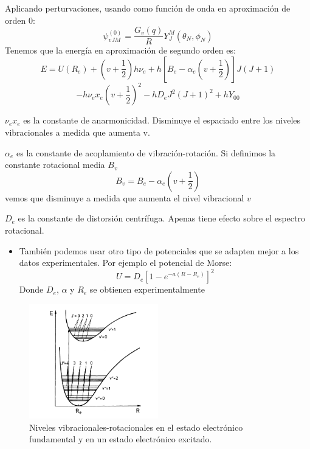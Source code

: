 \documentclass[a4paper]{beamer}
\begin{document}
\begin{frame}
\begin{itemize}
{\small
\item Aplicando perturvaciones, usando como función de onda en aproximación de orden 0: $$\psi^{(0)}_{vJM}=\frac{G_v(q)}{R}Y^M_J(\theta_N,\phi_N)$$
Tenemos que la energía en aproximación de segundo orden es:
$$
E=U(R_e)+\left(v+\frac{1}{2}\right)h\nu_e+h\left[B_e-\alpha_e\left(v+\frac{1}{2}\right)\right]J(J+1)
$$
\begin{equation*}
-h\nu_ex_e\left(v+\frac{1}{2}\right)^2-hD_eJ^2(J+1)^2 +hY_{00}
\end{equation*}
}
\begin{itemize}
{\tiny
\item $\nu_ex_e$ es la constante de anarmonicidad. Disminuye el espaciado entre los niveles vibracionales a medida que aumenta v.
\item $\alpha_e$ es la constante de acoplamiento de vibración-rotación. Si definimos la constante rotacional media $B_v$
\begin{equation*}
B_v=B_e-\alpha_e\left(v+\frac{1}{2}\right)
\end{equation*}
vemos que disminuye a medida que aumenta el nivel vibracional $v$ 
\item $D_e$ es la constante de distorsión centrífuga. Apenas tiene efecto sobre el espectro rotacional.}
\end{itemize}
\end{itemize}
\end{frame}

\begin{frame}
\begin{itemize}
\item También podemos usar otro tipo de potenciales que se adapten mejor a los datos experimentales. Por ejemplo el potencial de Morse:
\begin{equation*}
U=D_e \left[ 1- e^{-a(R-R_e)} \right]^2
\end{equation*}
Donde $D_e$, $\alpha$ y $R_e$ se obtienen experimentalmente
\end{itemize}
{\tiny
\begin{figure}
\includegraphics[width=0.5\textwidth]{niv_rot_vib_elect.png}
\caption{Niveles vibracionales-rotacionales en el estado electrónico fundamental y en un estado electrónico excitado.}
\end{figure}
}
\end{frame}
\end{document}
